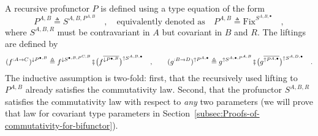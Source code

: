 A recursive profunctor $P$ is defined using a type equation of the
form
\[
P^{A,B}\triangleq S^{A,B,P^{A,B}}\quad,\quad\text{equivalently denoted as}\quad P^{A,B}\triangleq\text{Fix}^{S^{A,B,\bullet}}\quad,
\]
where $S^{A,B,R}$ must be contravariant in $A$ but covariant in
$B$ and $R$. The liftings are defined by
\[
(f^{:A\rightarrow C})^{\downarrow P^{\bullet,B}}\triangleq f^{\downarrow S^{\bullet,B,P^{C,B}}}\bef\big(f^{\overline{\downarrow P^{\bullet,B}}}\big)^{\uparrow S^{A,B,\bullet}}\quad,\quad\quad(g^{:B\rightarrow D})^{\uparrow P^{A,\bullet}}\triangleq g^{\uparrow S^{A,\bullet,P^{A,B}}}\bef\big(g^{\overline{\uparrow P^{A,\bullet}}}\big)^{\uparrow S^{A,D,\bullet}}\quad.
\]
The inductive assumption is two-fold: first, that the recursively
used lifting to $P^{A,B}$ already satisfies the commutativity law.
Second, that the profunctor $S^{A,B,R}$ satisfies the commutativity
law with respect to \emph{any} two parameters (we will prove that
law for covariant type parameters in Section~\ref{subsec:Proofs-of-commutativity-for-bifunctor}).

